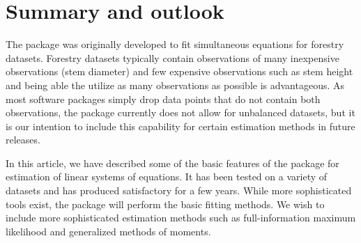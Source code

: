 \section{Summary and outlook}\label{sec:Summmary}

The  package was originally developed to fit
simultaneous equations for forestry datasets. Forestry datasets
typically contain observations of many inexpensive observations (stem
diameter) and few expensive observations such as stem height and being
able the utilize as many observations as possible is advantageous. As
most software packages simply drop data points that do not contain
both observations, the  package currently does not
allow for unbalanced datasets, but it is our intention to include this
capability for certain estimation methods in future releases.

In this article, we have described some of the basic features of the
 package for estimation of linear systems of
equations. It has been tested on a variety of datasets and has
produced satisfactory for a few years. While more sophisticated tools
exist, the  package will perform the basic fitting
methods. We wish to include more sophisticated estimation methods such
as full-information maximum likelihood and generalized methods of
moments.


